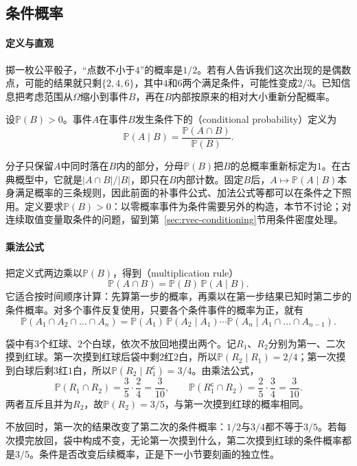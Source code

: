 \subsection{条件概率}
\label{sec:prob-conditional-probability}

\paragraph{定义与直观}
掷一枚公平骰子，“点数不小于$4$”的概率是$1/2$。若有人告诉我们这次出现的是偶数点，可能的结果就只剩$\{2,4,6\}$，其中$4$和$6$两个满足条件，可能性变成$2/3$。已知信息把考虑范围从$\Omega$缩小到事件$B$，再在$B$内部按原来的相对大小重新分配概率。

\begin{definition}[条件概率]
\label{def:prob-conditional-probability}
设$\mathbb{P}(B)>0$。事件$A$在事件$B$发生条件下的（conditional probability）定义为
\[
  \mathbb{P}(A\mid B)=\frac{\mathbb{P}(A\cap B)}{\mathbb{P}(B)} .
\]
\end{definition}

分子只保留$A$中同时落在$B$内的部分，分母$\mathbb{P}(B)$把$B$的总概率重新标定为$1$。在古典概型中，它就是$|A\cap B|/|B|$，即只在$B$内部计数。固定$B$后，$A\mapsto\mathbb{P}(A\mid B)$本身满足概率的三条规则，因此前面的补事件公式、加法公式等都可以在条件之下照用。定义要求$\mathbb{P}(B)>0$：以零概率事件为条件需要另外的构造，本节不讨论；对连续取值变量取条件的问题，留到第~\ref{sec:rvec-conditioning}节用条件密度处理。

\paragraph{乘法公式}
把定义式两边乘以$\mathbb{P}(B)$，得到（multiplication rule）
\[
  \mathbb{P}(A\cap B)=\mathbb{P}(B)\,\mathbb{P}(A\mid B).
\]
它适合按时间顺序计算：先算第一步的概率，再乘以在第一步结果已知时第二步的条件概率。对多个事件反复使用，只要各个条件事件的概率为正，就有
\[
  \mathbb{P}(A_1\cap A_2\cap\dots\cap A_n)
  =\mathbb{P}(A_1)\,\mathbb{P}(A_2\mid A_1)\cdots\mathbb{P}(A_n\mid A_1\cap\dots\cap A_{n-1}).
\]

\begin{example}[不放回抽球]
\label{ex:prob-urn-without-replacement}
袋中有$3$个红球、$2$个白球，依次不放回地摸出两个。记$R_1$、$R_2$分别为第一、二次摸到红球。第一次摸到红球后袋中剩$2$红$2$白，所以$\mathbb{P}(R_2\mid R_1)=2/4$；第一次摸到白球后剩$3$红$1$白，所以$\mathbb{P}(R_2\mid R_1^{\mathsf c})=3/4$。由乘法公式，
\[
  \mathbb{P}(R_1\cap R_2)=\frac35\cdot\frac24=\frac{3}{10},\qquad
  \mathbb{P}(R_1^{\mathsf c}\cap R_2)=\frac25\cdot\frac34=\frac{3}{10}.
\]
两者互斥且并为$R_2$，故$\mathbb{P}(R_2)=3/5$，与第一次摸到红球的概率相同。

不放回时，第一次的结果改变了第二次的条件概率：$1/2$与$3/4$都不等于$3/5$。若每次摸完放回，袋中构成不变，无论第一次摸到什么，第二次摸到红球的条件概率都是$3/5$。条件是否改变后续概率，正是下一小节要刻画的独立性。
\end{example}

